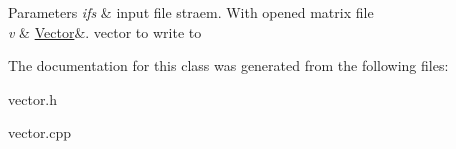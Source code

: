 \begin{DoxyParams}{Parameters}
{\em ifs} & input file straem. With opened matrix file \\
\hline
{\em v} & \hyperlink{class_vector}{Vector}\&. vector to write to \\
\hline
\end{DoxyParams}


The documentation for this class was generated from the following files\+:\begin{DoxyCompactItemize}
\item 
vector.\+h\item 
vector.\+cpp\end{DoxyCompactItemize}
